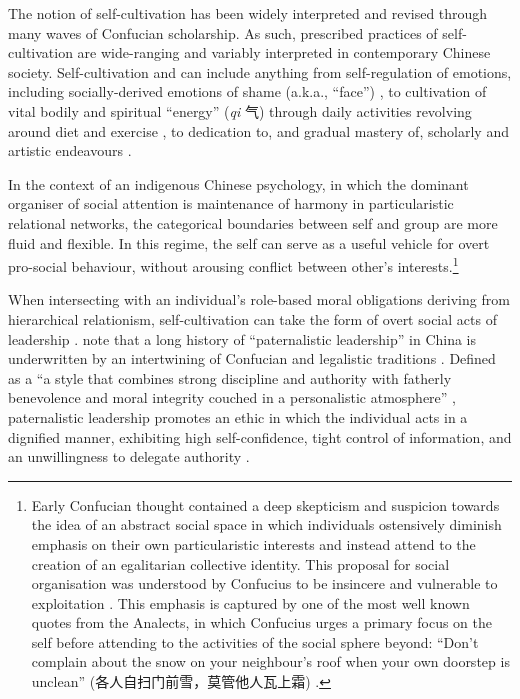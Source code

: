 \begin{CJK}{UTF8}{gbsn}
The notion of self-cultivation has been widely interpreted and revised through many waves of Confucian scholarship. As such, prescribed practices of self-cultivation are wide-ranging and variably interpreted in contemporary Chinese society.  Self-cultivation and can include anything from self-regulation of emotions, including socially-derived emotions of shame (a.k.a., ``face'') \citep{Matsumoto2012}, to cultivation of vital bodily and spiritual ``energy'' (\textit{qi} 气) through daily activities revolving around diet and exercise \citep{Farquhar2012}, to dedication to, and gradual mastery of, scholarly and artistic endeavours \citep{Slingerland2000}.

In the context of an indigenous Chinese psychology, in which the dominant organiser of social attention is maintenance of harmony in particularistic relational networks, the categorical boundaries between self and group are more fluid and flexible.  In this regime, the self can serve as a useful vehicle for overt pro-social behaviour, without arousing conflict between other's interests.\footnote{Early Confucian thought contained a deep skepticism and suspicion towards the idea of an abstract social space in which individuals ostensively diminish emphasis on their own particularistic interests and instead attend to the creation of an egalitarian collective identity.  This proposal for social organisation was understood by Confucius to be insincere and vulnerable to exploitation \citep{Bollas2013}.  This emphasis is captured by one of the most well known quotes from the Analects, in which Confucius urges a primary focus on the self before attending to the activities of the social sphere beyond: ``Don’t complain about the snow on your neighbour’s roof when your own doorstep is unclean'' (各人自扫门前雪，莫管他人瓦上霜) \citep{Leys1997}.}

When intersecting with an individual's role-based moral obligations deriving from hierarchical relationism, self-cultivation can take the form of overt social acts of leadership \citep{Woods2011}.  \textcite{Farh200} note that a long history of ``paternalistic leadership'' in China is underwritten by an intertwining of Confucian and legalistic traditions \citep{Farh2000}.  Defined as a ``a style that combines strong discipline and authority with fatherly benevolence and moral integrity couched in a personalistic atmosphere'' \citep[91]{Cheng2004}, paternalistic leadership promotes an ethic in which the individual acts in a dignified manner, exhibiting high self-confidence, tight control of information, and an unwillingness to delegate authority \citep{Liu2003}.


\end{CJK}
